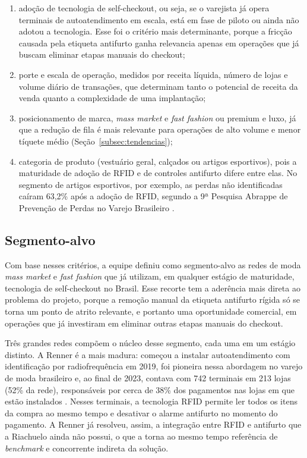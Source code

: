 \begin{enumerate}[label=\alph*)]
    \item adoção de tecnologia de self-checkout, ou seja, se o varejista já opera terminais de autoatendimento em escala, está em fase de piloto ou ainda não adotou a tecnologia. Esse foi o critério mais determinante, porque a fricção causada pela etiqueta antifurto ganha relevancia apenas em operações que já buscam eliminar etapas manuais do checkout;
    \item porte e escala de operação, medidos por receita líquida, número de lojas e volume diário de transações, que determinam tanto o potencial de receita da venda quanto a complexidade de uma implantação;
    \item posicionamento de marca, \textit{mass market} e \textit{fast fashion} ou premium e luxo, já que a redução de fila é mais relevante para operações de alto volume e menor tíquete médio (Seção~\ref{subsec:tendencias});
    \item categoria de produto (vestuário geral, calçados ou artigos esportivos), pois a maturidade de adoção de RFID e de controles antifurto difere entre elas. No segmento de artigos esportivos, por exemplo, as perdas não identificadas caíram 63,2\% após a adoção de RFID, segundo a 9ª Pesquisa Abrappe de Prevenção de Perdas no Varejo Brasileiro \cite{cartacapital2026perdas}.
\end{enumerate}

\subsection{Segmento-alvo}
\label{subsec:segmento_alvo}

Com base nesses critérios, a equipe definiu como segmento-alvo as redes de moda \textit{mass market} e \textit{fast fashion} que já utilizam, em qualquer estágio de maturidade, tecnologia de self-checkout no Brasil. Esse recorte tem a aderência mais direta ao problema do projeto, porque a remoção manual da etiqueta antifurto rígida só se torna um ponto de atrito relevante, e portanto uma oportunidade comercial, em operações que já investiram em eliminar outras etapas manuais do checkout.

Três grandes redes compõem o núcleo desse segmento, cada uma em um estágio distinto. A Renner é a mais madura: começou a instalar autoatendimento com identificação por radiofrequência em 2019, foi pioneira nessa abordagem no varejo de moda brasileiro e, ao final de 2023, contava com 742 terminais em 213 lojas (52\% da rede), responsáveis por cerca de 38\% dos pagamentos nas lojas em que estão instalados \cite{fashionnetwork2024renner,consumidormoderno2025renner}. Nesses terminais, a tecnologia RFID permite ler todos os itens da compra ao mesmo tempo e desativar o alarme antifurto no momento do pagamento. A Renner já resolveu, assim, a integração entre RFID e antifurto que a Riachuelo ainda não possui, o que a torna ao mesmo tempo referência de \textit{benchmark} e concorrente indireta da solução.

